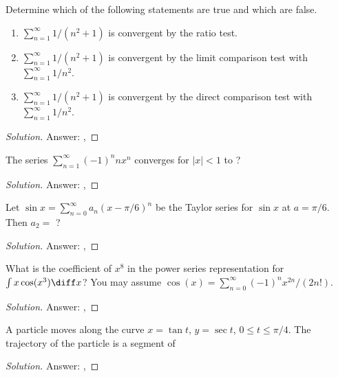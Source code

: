 \begin{problem}
Determine which of the following statements are true and which are false.
\begin{enumerate}[label=(\MakeUppercase{\roman*})]
\item $\sum_{n=1}^\infty 1/(n^2+1)$ is convergent by the ratio test.
\item $\sum_{n=1}^\infty 1/(n^2+1)$ is convergent by the limit comparison
  test with $\sum_{n=1}^\infty 1/n^2$.
\item $\sum_{n=1}^\infty 1/(n^2+1)$ is convergent by the direct comparison
  test with $\sum_{n=1}^\infty 1/n^2$.
\end{enumerate}
\end{problem}
\begin{proof}[Solution]
Answer: {\color{Green}}, {\color{Red}}
\end{proof}

\begin{problem}
The series $\sum_{n=1}^\infty(-1)^nnx^n$ converges for $|x|<1$ to ?
\end{problem}
\begin{proof}[Solution]
Answer: {\color{Green}}, {\color{Red}}
\end{proof}

\begin{problem}
Let $\sin x=\sum_{n=0}^\infty a_n\left(x-\pi/6\right)^n$ be the Taylor
series for $\sin x$ at $a=\pi/6$. Then $a_2=$ ?
\end{problem}
\begin{proof}[Solution]
Answer: {\color{Green}}, {\color{Red}}
\end{proof}

\begin{problem}
What is the coefficient of  $x^8$ in the power series representation for
$\int x\cos(x^3)\diff x$? You may assume $\cos(x)=\sum_{n=0}^\infty(-1)^n
x^{2n}/(2n!)$.
\end{problem}
\begin{proof}[Solution]
Answer: {\color{Green}}, {\color{Red}}
\end{proof}

\begin{problem}
A particle moves along  the curve $x=\tan t$, $y=\sec t$, $0\leq t\leq
\pi/4$. The trajectory of the particle is a segment of
\end{problem}
\begin{proof}[Solution]
Answer: {\color{Green}}, {\color{Red}}
\end{proof}

